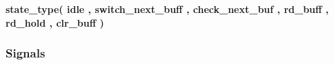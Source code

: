 \begin{DoxyCompactItemize}
\item 
{\bfseries {\bf state\+\_\+type}{\bfseries \textcolor{vhdlchar}{(}\textcolor{vhdlchar}{ }\textcolor{vhdlchar}{idle}\textcolor{vhdlchar}{ }\textcolor{vhdlchar}{,}\textcolor{vhdlchar}{ }\textcolor{vhdlchar}{switch\+\_\+next\+\_\+buff}\textcolor{vhdlchar}{ }\textcolor{vhdlchar}{,}\textcolor{vhdlchar}{ }\textcolor{vhdlchar}{check\+\_\+next\+\_\+buf}\textcolor{vhdlchar}{ }\textcolor{vhdlchar}{,}\textcolor{vhdlchar}{ }\textcolor{vhdlchar}{rd\+\_\+buff}\textcolor{vhdlchar}{ }\textcolor{vhdlchar}{,}\textcolor{vhdlchar}{ }\textcolor{vhdlchar}{rd\+\_\+hold}\textcolor{vhdlchar}{ }\textcolor{vhdlchar}{,}\textcolor{vhdlchar}{ }\textcolor{vhdlchar}{clr\+\_\+buff}\textcolor{vhdlchar}{ }\textcolor{vhdlchar}{)}\textcolor{vhdlchar}{ }}} 
\end{DoxyCompactItemize}
\subsubsection*{Signals}
